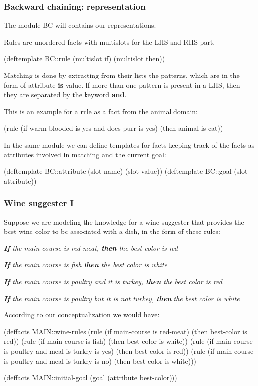 \documentclass[xcolor={usenames,dvipsnames,svgnames}, compress]{beamer}
\begin{document}
\begin{frame}[fragile]
  \frametitle{Backward chaining: representation}

  The module \textsf{BC} will contains our representations.\par
  Rules are unordered facts with multislots for the LHS and RHS part.
  \begin{clips-code}[numbers=none]
    (deftemplate BC::rule
        (multislot if) (multislot then))
  \end{clips-code}
  Matching is done by extracting from their lists the patterns, which are in
  the form of \textsf{attribute \textbf{is} value}. If more than one
  pattern is present in a LHS, then they are separated by the keyword
  \textbf{\textsf{and}}.\par
  This is an example for a rule as a fact from the animal domain:
  \begin{clips-code}[numbers=none]
    (rule (if warm-blooded is yes and does-purr is yes)
          (then animal is cat))
  \end{clips-code}

  In the same module we can define templates for facts keeping track
  of the facts as attributes involved in matching and the current goal:
 \begin{clips-code}[numbers=none]
    (deftemplate BC::attribute 
        (slot name) (slot value))
    (deftemplate BC::goal (slot attribute))
  \end{clips-code}
\end{frame}

\begin{frame}[fragile]
  \frametitle{Wine suggester I}
  Suppose we are modeling the knowledge for a wine suggester that
  provides the best wine color to be associated with a dish, in the
  form of these rules:\par\bigskip

  \emph{\textbf{If} the main course is red meat, \textbf{then} the best color is red}\par
  \emph{\textbf{If} the main course is fish \textbf{then} the best color is white}\par
  \emph{\textbf{If} the main course is poultry and it is turkey, \textbf{then} the best color
  is red}\par
  \emph{\textbf{If} the main course is poultry but it is not turkey, \textbf{then} the best
  color is white}\par\bigskip

According to our conceptualization we would have:
\begin{clips-code}[numbers=none]
  (deffacts MAIN::wine-rules
      (rule (if main-course is red-meat) (then best-color is red))
      (rule (if main-course is fish) (then best-color is white))
      (rule (if main-course is poultry and meal-is-turkey is yes)
            (then best-color is red))
      (rule (if main-course is poultry and meal-is-turkey is no)
            (then best-color is white)))

  (deffacts MAIN::initial-goal (goal (attribute best-color)))
\end{clips-code}
\end{frame}
\end{document}
